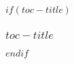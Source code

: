 \begin{frame}
    $if(toc-title)$
      \frametitle{$toc-title$}
    $endif$
      \tableofcontents
  \end{frame}